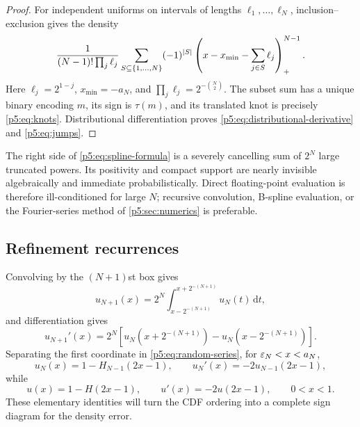 \documentclass[11pt,oneside]{article}
\numberwithin{equation}{section}
\theoremstyle{definition}
\theoremstyle{remark}
\newcommand{\dd}{\,\mathrm d}
\begin{document}
\begin{proof}
For independent uniforms on intervals of lengths $\ell_1,\ldots,\ell_N$, inclusion--exclusion gives the density
\[
 \frac1{(N-1)!\prod_j\ell_j}
 \sum_{S\subseteq\{1,\ldots,N\}}(-1)^{\left\lvert S\right\rvert}
 \left(x-x_{\min}-\sum_{j\in S}\ell_j\right)_{+}^{N-1}.
\]
Here $\ell_j=2^{1-j}$, $x_{\min}=-a_N$, and
$\prod_j\ell_j=2^{-\binom N2}$.  The subset sum has a unique binary encoding $m$, its sign is $\tau(m)$, and its translated knot is precisely \eqref{p5:eq:knots}.  Distributional differentiation proves \eqref{p5:eq:distributional-derivative} and \eqref{p5:eq:jumps}.
\end{proof}

\begin{remark}
The right side of \eqref{p5:eq:spline-formula} is a severely cancelling sum of $2^N$ large truncated powers.  Its positivity and compact support are nearly invisible algebraically and immediate probabilistically.  Direct floating-point evaluation is therefore ill-conditioned for large $N$; recursive convolution, B-spline evaluation, or the Fourier-series method of \cref{p5:sec:numerics} is preferable.
\end{remark}

\subsection{Refinement recurrences}

Convolving by the $(N+1)$st box gives
\begin{equation}
 u_{N+1}(x)=2^N\int_{x-2^{-(N+1)}}^{x+2^{-(N+1)}}u_N(t)\dd t,
 \label{p5:eq:averaging}
\end{equation}
and differentiation gives
\begin{equation}
 u_{N+1}'(x)=2^N\left[
 u_N\!\left(x+2^{-(N+1)}\right)
 -u_N\!\left(x-2^{-(N+1)}\right)
 \right].
 \label{p5:eq:derivative-rec}
\end{equation}
Separating the first coordinate in \eqref{p5:eq:random-series}, for $\varepsilon_N<x<a_N$,
\begin{equation}
 u_N(x)=1-H_{N-1}(2x-1),
 \qquad
 u_N'(x)=-2u_{N-1}(2x-1),
 \label{p5:eq:first-coordinate-finite}
\end{equation}
while
\begin{equation}
 u(x)=1-H(2x-1),
 \qquad
 u'(x)=-2u(2x-1),
 \qquad 0<x<1.
 \label{p5:eq:first-coordinate-limit}
\end{equation}
These elementary identities will turn the CDF ordering into a complete sign diagram for the density error.
\end{document}
